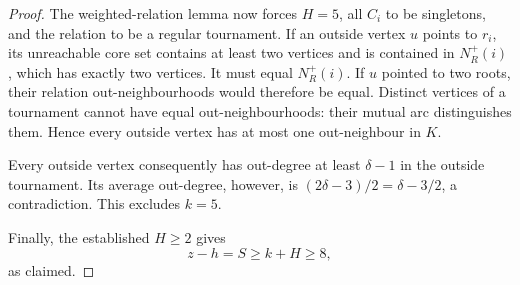\begin{proof}
The weighted-relation lemma now forces $H=5$, all $C_i$ to be
singletons, and the relation to be a regular tournament. If an
outside vertex $u$ points to $r_i$, its unreachable core set
contains at least two vertices and is contained in $N_R^+(i)$,
which has exactly two vertices. It must equal $N_R^+(i)$.
If $u$ pointed to two roots, their relation out-neighbourhoods
would therefore be equal. Distinct vertices of a tournament
cannot have equal out-neighbourhoods: their mutual arc
distinguishes them. Hence every outside vertex has at most one
out-neighbour in $K$.

Every outside vertex consequently has out-degree at least
$\delta-1$ in the outside tournament. Its average out-degree,
however, is $(2\delta-3)/2=\delta-3/2$, a contradiction.
This excludes $k=5$.

Finally, the established $H\ge2$ gives
\[
 z-h=S\ge k+H\ge8,
\]
as claimed.
\end{proof}
